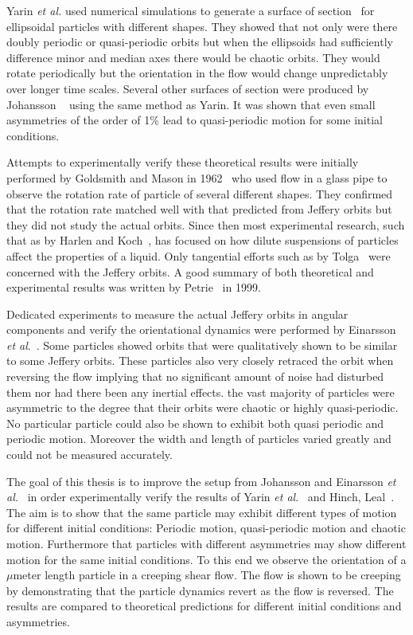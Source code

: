 Yarin \emph{et al.} used numerical simulations to generate a surface of section~\cite{SurfaceOfSection} for ellipsoidal particles with different shapes. They showed that not only were there doubly periodic or quasi-periodic orbits but when the ellipsoids had sufficiently difference minor and median axes there would be chaotic orbits. They would rotate periodically but the orientation in the flow would change unpredictably over longer time scales.
Several other surfaces of section were produced by Johansson ~\cite{AntonThesis} using the same method as Yarin. It was shown that even small asymmetries of the order of 1\% lead to quasi-periodic motion for some initial conditions.

Attempts to experimentally verify these theoretical results were initially performed by Goldsmith and Mason in 1962~\cite{Mason} who used flow in a glass pipe to observe the rotation rate of particle of several different shapes. They confirmed that the rotation rate matched well with that predicted from Jeffery orbits but they did not study the actual orbits. Since then most experimental research, such that as by Harlen and Koch~\cite{fibersspension}, has focused on how dilute suspensions of particles affect the properties of a liquid. Only tangential efforts such as by Tolga~\cite{Tolga} were concerned with the Jeffery orbits. A good summary of both theoretical and experimental results was written by Petrie~\cite{Petrie} in 1999.

Dedicated experiments to measure the actual Jeffery orbits in angular components and verify the orientational dynamics were performed by Einarsson \emph{et al}.~\cite{JonasExperiment}. Some particles showed orbits that were qualitatively shown to be similar to some Jeffery orbits. These particles also very closely retraced the orbit when reversing the flow implying that no significant amount of noise had disturbed them nor had there been any inertial effects. the vast majority of particles were asymmetric to the degree that their orbits were chaotic or highly quasi-periodic. No particular particle could also be shown to exhibit both quasi periodic and periodic motion. Moreover the width and length of particles varied greatly and could not be measured accurately.

The goal of this thesis is to improve the setup from Johansson\cite{AntonThesis} and Einarsson \emph{et al.}~\cite{JonasExperiment} in order experimentally verify the results of Yarin \emph{et al}.~\cite{Yarin} and Hinch, Leal~\cite{Yarin, Leal}. The aim is to show that the same particle may exhibit different types of motion for different initial conditions: Periodic motion, quasi-periodic motion and chaotic motion. Furthermore that particles with different asymmetries may show different motion for the same initial conditions. To this end we observe the orientation of a $\mu$meter length particle in a creeping shear flow. The flow is shown to be creeping by demonstrating that the particle dynamics revert as the flow is reversed. The results are compared to theoretical predictions for different initial conditions and asymmetries.


